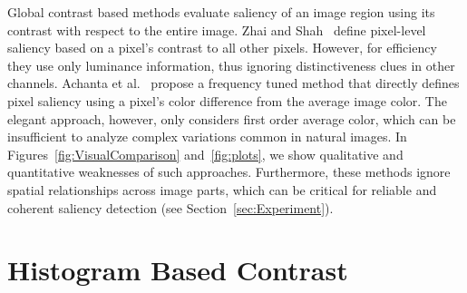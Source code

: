 \documentclass[10pt,twocolumn,letterpaper]{article}
\newcommand{\secref}[1]{Section~\ref{#1}}
\begin{document}
Global contrast based methods evaluate saliency of an image region using its contrast
with respect to the entire image.
%
Zhai and Shah~\cite{06acmmm/ZhaiS_spatiotemporal} define pixel-level saliency based on a pixel's contrast to all other pixels.
However, for efficiency they use only luminance information, thus ignoring distinctiveness clues in other channels.
%
Achanta et al.~\cite{09cvpr/Achanta_FTSaliency} propose a frequency tuned method that
directly defines pixel saliency using a pixel's color difference from the average image
color. The elegant approach, however, only considers first order average color, which
can be insufficient to analyze complex variations common in natural images.
%
In Figures~\ref{fig:VisualComparison} and~\ref{fig:plots}, we show qualitative and
quantitative weaknesses of such approaches. Furthermore, these methods ignore spatial
relationships across image parts, which can be critical for reliable and coherent
saliency detection (see \secref{sec:Experiment}).


\section{Histogram Based Contrast}\label{sec:HC}
\end{document}
